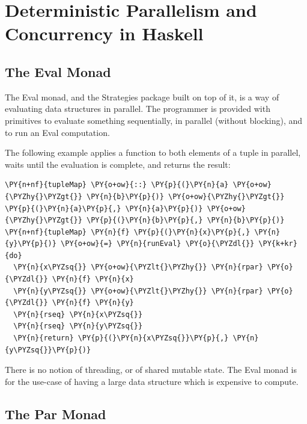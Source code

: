 \section{Deterministic Parallelism and Concurrency in Haskell}
\label{sec:dejafu-par}

\subsection*{The Eval Monad}
\label{sec:dejafu-par-eval}

The Eval monad, and the Strategies\cite{strategies} package built on
top of it, is a way of evaluating data structures in parallel. The
programmer is provided with primitives to evaluate something
sequentially, in parallel (without blocking), and to run an Eval
computation.

The following example\cite{parconc} applies a function to both
elements of a tuple in parallel, waits until the evaluation is
complete, and returns the result:


\begin{Verbatim}[commandchars=\\\{\}]
\PY{n+nf}{tupleMap} \PY{o+ow}{::} \PY{p}{(}\PY{n}{a} \PY{o+ow}{\PYZhy{}\PYZgt{}} \PY{n}{b}\PY{p}{)} \PY{o+ow}{\PYZhy{}\PYZgt{}} \PY{p}{(}\PY{n}{a}\PY{p}{,} \PY{n}{a}\PY{p}{)} \PY{o+ow}{\PYZhy{}\PYZgt{}} \PY{p}{(}\PY{n}{b}\PY{p}{,} \PY{n}{b}\PY{p}{)}
\PY{n+nf}{tupleMap} \PY{n}{f} \PY{p}{(}\PY{n}{x}\PY{p}{,} \PY{n}{y}\PY{p}{)} \PY{o+ow}{=} \PY{n}{runEval} \PY{o}{\PYZdl{}} \PY{k+kr}{do}
  \PY{n}{x\PYZsq{}} \PY{o+ow}{\PYZlt{}\PYZhy{}} \PY{n}{rpar} \PY{o}{\PYZdl{}} \PY{n}{f} \PY{n}{x}
  \PY{n}{y\PYZsq{}} \PY{o+ow}{\PYZlt{}\PYZhy{}} \PY{n}{rpar} \PY{o}{\PYZdl{}} \PY{n}{f} \PY{n}{y}
  \PY{n}{rseq} \PY{n}{x\PYZsq{}}
  \PY{n}{rseq} \PY{n}{y\PYZsq{}}
  \PY{n}{return} \PY{p}{(}\PY{n}{x\PYZsq{}}\PY{p}{,} \PY{n}{y\PYZsq{}}\PY{p}{)}
\end{Verbatim}

There is no notion of threading, or of shared mutable state. The Eval
monad is for the use-case of having a large data structure which is
expensive to compute.

\subsection*{The Par Monad}
\label{sec:dejafu-par-par}

